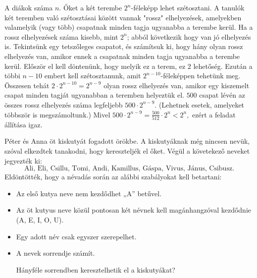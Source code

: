 \begin{solution}
A diákok száma $n$. Őket a két terembe $2^{n}$-féleképp lehet szétosztani.
A tanulók két teremben való szétosztásai között vannak "rossz" elhelyezések,
amelyekben valamelyik (vagy több) csapatnak minden tagja ugyanabba
a terembe kerül. Ha a rossz elhelyezések száma kisebb, mint $2^{n}$;
abból következik hogy van jó elhelyezés is. Tekintsünk egy tetszőleges
csapatot, és számítsuk ki, hogy hány olyan rossz elhelyezés van, amikor
ennek a csapatnak minden tagja ugyanabba a terembe kerül. Először
el kell döntenünk, hogy melyik ez a terem, ez $2$ lehetőség. Ezután
a többi $n-10$ embert kell szétosztanunk, amit $2^{n-10}$-féleképpen
tehetünk meg. Összesen tehát $2\cdot2^{n-10}=2^{n-9}$ olyan rossz
elhelyezés van, amikor egy kiszemelt csapat minden tagját ugyanabban
a teremben helyeztük el. $500$ csapat lévén az összes rossz elhelyezés
száma legfeljebb $500\cdot2^{n-9}.$ (Lehetnek esetek, amelyeket többször
is megszámoltunk.) Mivel $500\cdot2^{n-9}=\frac{500}{512}\cdot2^{n}<2^{n},$
ezért a feladat állítása igaz. 
\end{solution}
\begin{extraproblem}
 Péter és Anna öt kiskutyát fogadott örökbe. A kiskutyáknak még nincsen
nevük, szóval elkezdtek tanakodni, hogy kereszteljék el őket. Végül
a követekező neveket jegyezték ki: 
\[
\text{Ali, Eli, Csillu, Tomi, Andi, Kamillus, Gáspa, Vivus, Jánus, Csibusz.}
\]
Eldöntötték, hogy a névadás során az alábbi szabályokat kell betartani: 
\begin{itemize}
\item Az első kutya neve nem kezdődhet „A” betűvel. 
\item Az öt kutyus neve közül pontosan két névnek kell magánhangzóval kezdődnie
(A, E, I, O, U). 
\item Egy adott név csak egyszer szerepelhet. 
\item A nevek sorrendje számít.

Hányféle sorrendben keresztelhetik el a kiskutyákat? 

\end{itemize}
\end{extraproblem}

